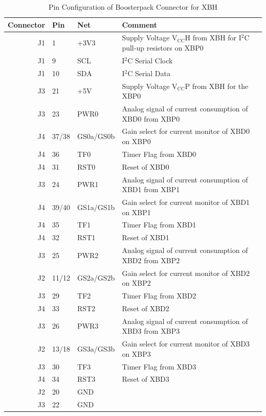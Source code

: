 \documentclass{article}
\begin{document}
\begin{table}[ht]
  \begin{center}
    \caption{Pin Configuration of Boosterpack Connector for XBH}
    \begin{tabular}{rlll}
      Connector & Pin  & Net         & Comment  \\ \hline
       J1 & 1  & +3V3      & Supply Voltage $\mathrm{V_{CC}H}$ from XBH for I$^2$C pull-up resistors on XBP0 \\
       J1 & 9  & SCL       & I$^2$C Serial Clock  \\
       J1 & 10 & SDA       & I$^2$C Serial Data \\ 
       J3 & 21 & +5V       & Supply Voltage $\mathrm{V_{CC}P}$ from XBH for the XBP0 \\ \hline

       J3 & 23 & PWR0      & Analog signal of current consumption of XBD0 from XBP0\\
       J4 & 37/38 & GS0a/GS0b & Gain select for current monitor of XBD0 on XBP0\\
       J4 & 36 & TF0       & Timer Flag from XBD0 \\
       J4 & 31 & RST0      & Reset of XBD0 \\ \hline

       J3 & 24 & PWR1      & Analog signal of current consumption of XBD1 from XBP1 \\
       J4 & 39/40 & GS1a/GS1b & Gain select for current monitor of XBD1 on XBP1\\
       J4 & 35 & TF1       & Timer Flag from XBD1 \\
       J4 & 32 & RST1      & Reset of XBD1 \\ \hline

       J3 & 25 & PWR2      & Analog signal of current consumption of XBD2 from XBP2 \\
       J2 & 11/12 & GS2a/GS2b & Gain select for current monitor of XBD2 on XBP2\\
       J3 & 29 & TF2       & Timer Flag from XBD2 \\
       J4 & 33 & RST2      & Reset of XBD2 \\ \hline

       J3 & 26 & PWR3      & Analog signal of current consumption of XBD3 from XBP3 \\
       J2 & 13/18 & GS3a/GS3b & Gain select for current monitor of XBD3 on XBP3\\
       J3 & 30 & TF3       & Timer Flag from XBD3 \\
       J4 & 34 & RST3      & Reset of XBD3 \\ \hline

       J2 & 20 & GND       & \\
       J3 & 22 & GND       & \\ \hline
    \end{tabular}
  \end{center}
\end{table}
\end{document}
